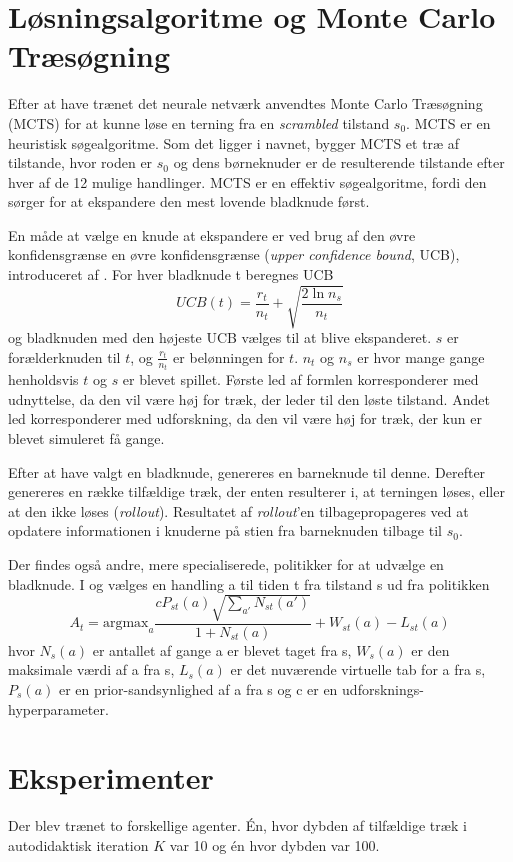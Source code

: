 \documentclass[../main.tex]{subfiles}
\begin{document}
\section{Løsningsalgoritme og Monte Carlo Træsøgning}
Efter at have trænet det neurale netværk anvendtes Monte Carlo Træsøgning (MCTS) for at kunne løse en terning fra en \emph{scrambled} tilstand $s_0$. MCTS er en heuristisk søgealgoritme. Som det ligger i navnet, bygger MCTS et træ af tilstande, hvor roden er $s_0$ og dens børneknuder er de resulterende tilstande efter hver af de 12 mulige handlinger. MCTS er en effektiv søgealgoritme, fordi den sørger for at ekspandere den mest lovende bladknude først. 

En måde at vælge en knude at ekspandere er ved brug af den øvre konfidensgrænse en øvre konfidensgrænse (\emph{upper confidence bound}, UCB), introduceret af \cite{Kocsis06banditbased}. For hver bladknude t beregnes UCB
$$UCB(t)=\frac{r_t}{n_t}+\sqrt{\frac{2\ln n_s}{n_t}}$$
og bladknuden med den højeste UCB vælges til at blive ekspanderet. $s$ er forælderknuden til $t$, og $\frac{r_t}{n_t}$ er belønningen for $t$. $n_t$ og $n_s$ er hvor mange gange henholdsvis $t$ og $s$ er blevet spillet. Første led af formlen korresponderer med udnyttelse, da den vil være høj for træk, der leder til den løste tilstand. Andet led korresponderer med udforskning, da den vil være høj for træk, der kun er blevet simuleret få gange. 

Efter at have valgt en bladknude, genereres en barneknude til denne. Derefter genereres en række tilfældige træk, der enten resulterer i, at terningen løses, eller at den ikke løses (\emph{rollout}). Resultatet af \emph{rollout}'en tilbagepropageres ved at opdatere informationen i knuderne på stien fra barneknuden tilbage til $s_0$. 

Der findes også andre, mere specialiserede, politikker for at udvælge en bladknude. I \cite{HumansBeGone} og \cite{mcaleer2018solving} vælges en handling a til tiden t fra tilstand s ud fra politikken
$$A_t=\text{argmax}_a\frac{cP_{st}(a)\sqrt{\sum_{a'}N_{st}(a')}}{1+N_{st}(a)} + W_{st}(a) - L_{st}(a)$$
hvor $N_s(a)$ er antallet af gange a er blevet taget fra s, $W_s(a)$ er den maksimale værdi af a fra s, $L_s(a)$ er det nuværende virtuelle tab for a fra s, $P_s(a)$ er en prior-sandsynlighed af a fra s og c er en udforsknings-hyperparameter. 
  

\section{Eksperimenter}
Der blev trænet to forskellige agenter. Én, hvor dybden af tilfældige træk i autodidaktisk iteration \(K\) var 10 og én hvor dybden var 100. 
\end{document}
